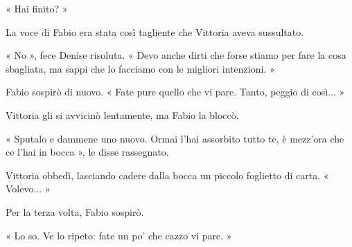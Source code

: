« Hai finito? »

La voce di Fabio era stata così tagliente che Vittoria aveva sussultato.

« No », fece Denise risoluta. « Devo anche dirti che forse stiamo per fare la cosa sbagliata, ma sappi che lo facciamo con le migliori intenzioni. »

Fabio sospirò di nuovo. « Fate pure quello che vi pare. Tanto, peggio di così... »

Vittoria gli si avvicinò lentamente, ma Fabio la bloccò.

« Sputalo e dammene uno nuovo. Ormai l'hai assorbito tutto te, è mezz'ora che ce l'hai in bocca », le disse rassegnato.

Vittoria obbedì, lasciando cadere dalla bocca un piccolo foglietto di carta. « Volevo... »

Per la terza volta, Fabio sospirò.

« Lo so. Ve lo ripeto: fate un po' che cazzo vi pare. »
